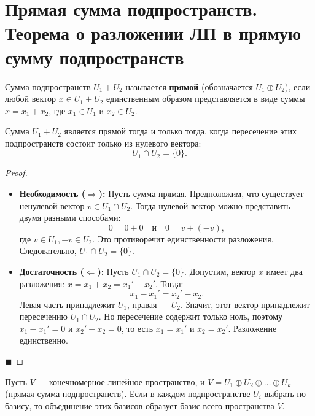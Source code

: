 \section{Прямая сумма подпространств. Теорема о разложении ЛП в прямую сумму подпространств}

\begin{definition}
Сумма подпространств $U_1 + U_2$ называется \textbf{прямой} (обозначается $U_1 \oplus U_2$), если любой вектор $x \in U_1 + U_2$ единственным образом представляется в виде суммы $x = x_1 + x_2$, где $x_1 \in U_1$ и $x_2 \in U_2$.
\end{definition}

\begin{theorem}
Сумма $U_1 + U_2$ является прямой тогда и только тогда, когда пересечение этих подпространств состоит только из нулевого вектора:
\[
U_1 \cap U_2 = \{0\}.
\]
\end{theorem}

\begin{proof}
\begin{itemize}
    \item \textbf{Необходимость ($\Rightarrow$):} Пусть сумма прямая. Предположим, что существует ненулевой вектор $v \in U_1 \cap U_2$. Тогда нулевой вектор можно представить двумя разными способами:
    \[
    0 = 0 + 0 \quad \text{и} \quad 0 = v + (-v),
    \]
    где $v \in U_1, -v \in U_2$. Это противоречит единственности разложения. Следовательно, $U_1 \cap U_2 = \{0\}$.
    \item \textbf{Достаточность ($\Leftarrow$):} Пусть $U_1 \cap U_2 = \{0\}$. Допустим, вектор $x$ имеет два разложения: $x = x_1 + x_2 = x_1' + x_2'$. Тогда:
    \[
    x_1 - x_1' = x_2' - x_2.
    \]
    Левая часть принадлежит $U_1$, правая --- $U_2$. Значит, этот вектор принадлежит пересечению $U_1 \cap U_2$. Но пересечение содержит только ноль, поэтому $x_1 - x_1' = 0$ и $x_2' - x_2 = 0$, то есть $x_1 = x_1'$ и $x_2 = x_2'$. Разложение единственно.
\end{itemize}
\hfill$\blacksquare$
\end{proof}

\begin{theorem}
Пусть $V$ --- конечномерное линейное пространство, и $V = U_1 \oplus U_2 \oplus \dots \oplus U_k$ (прямая сумма подпространств). Если в каждом подпространстве $U_i$ выбрать по базису, то объединение этих базисов образует базис всего пространства $V$.
\end{theorem}

